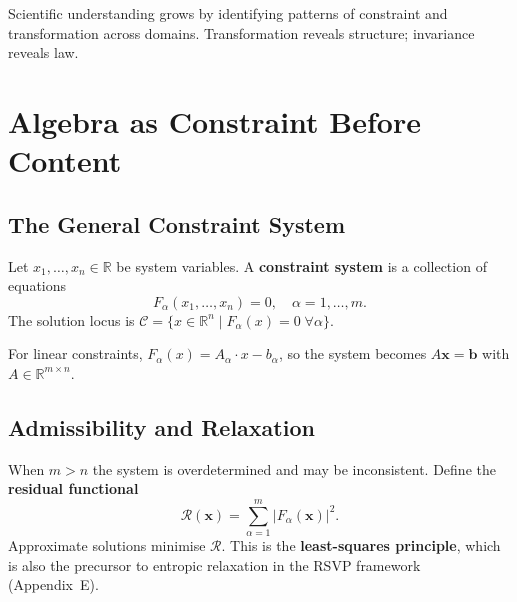 \documentclass[11pt, openany]{book}
\theoremstyle{plain}
\theoremstyle{definition}
\theoremstyle{remark}
\newcommand{\R}{\mathbb{R}}
\begin{document}
\begin{center}
\end{center}

\begin{principle}
Scientific understanding grows by identifying patterns of constraint and
transformation across domains. Transformation reveals structure; invariance
reveals law.
\end{principle}

\appendix

\chapter{Algebra as Constraint Before Content}

\section{The General Constraint System}

Let $x_1,\dots,x_n\in\R$ be system variables. A \textbf{constraint system}
is a collection of equations
\[
  F_\alpha(x_1,\dots,x_n)=0,\quad\alpha=1,\dots,m.
\]
The solution locus is $\mathcal{C}=\{x\in\R^n\mid F_\alpha(x)=0\;\forall\alpha\}$.

For linear constraints, $F_\alpha(x)=A_\alpha\cdot x - b_\alpha$, so the
system becomes $A\mathbf{x}=\mathbf{b}$ with $A\in\R^{m\times n}$.

\section{Admissibility and Relaxation}

When $m>n$ the system is overdetermined and may be inconsistent. Define the
\textbf{residual functional}
\[
  \mathcal{R}(\mathbf{x})=\sum_{\alpha=1}^m|F_\alpha(\mathbf{x})|^2.
\]
Approximate solutions minimise $\mathcal{R}$. This is the \textbf{least-squares
principle}, which is also the precursor to entropic relaxation in the RSVP
framework (Appendix~E).
\end{document}
